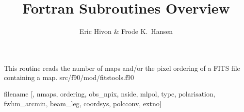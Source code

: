 
\sloppy


\title{\healpix Fortran Subroutines Overview}
 \section[getsize\_fits]{ }
\label{sub:getsize_fits}
\author{Eric Hivon \& Frode K.~Hansen}

\begin{facility}
{This routine reads the number of maps and/or the pixel ordering of a FITS file containing a \healpix map.}
{src/f90/mod/fitstools.f90}
\end{facility}

\begin{f90function}
{filename [, nmaps, ordering, obs\_npix, nside, mlpol, type, polarisation,
    fwhm\_arcmin, beam\_leg, coordsys, polcconv, extno]}
\end{f90function}

